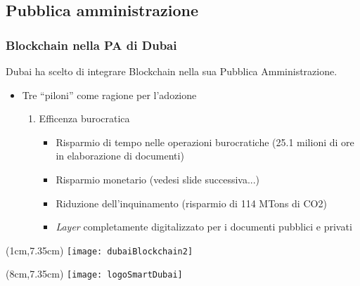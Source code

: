 \subsection{Pubblica amministrazione}
\begin{frame}
 \frametitle{Blockchain nella PA di Dubai}

 Dubai ha scelto di integrare Blockchain nella sua Pubblica Amministrazione.
 \begin{itemize}
  \item<1-> Tre ``piloni'' come ragione per l'adozione
  \begin{enumerate}
   \item<2-> Efficenza burocratica
   \begin{itemize}
   \item<3-> Risparmio di tempo nelle operazioni burocratiche (25.1 milioni di
ore in elaborazione di documenti)
   \item<4-> Risparmio monetario (vedesi slide successiva...)
   \item<5-> Riduzione dell'inquinamento (risparmio di 114 MTons di CO2)
   \item<6-> \textit{Layer} completamente digitalizzato per i documenti
pubblici e privati
  \end{itemize}
  \end{enumerate}

 \end{itemize}


 \begin{textblock*}{5cm}(1cm,7.35cm)
  \texttt{[image: dubaiBlockchain2]}
 \end{textblock*}

 \begin{textblock*}{5cm}(8cm,7.35cm)
  \texttt{[image: logoSmartDubai]}
 \end{textblock*}

\end{frame}

